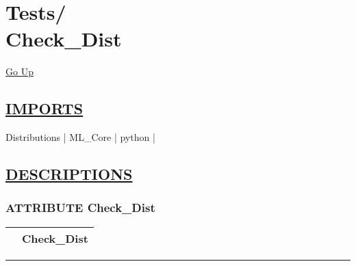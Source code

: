 \chapter*{\color{headfile}
{\large Tests\slash\hspace{0pt}}
 \\
Check_Dist
}
\hypertarget{ecldoc:toc:Tests.Check_Dist}{}
\hyperlink{ecldoc:toc:root/Tests}{Go Up}

\section*{\underline{\textsf{IMPORTS}}}
\begin{doublespace}
{\large
Distributions |
ML\_Core |
python |
}
\end{doublespace}

\section*{\underline{\textsf{DESCRIPTIONS}}}
\subsection*{\textsf{\colorbox{headtoc}{\color{white} ATTRIBUTE}
Check\_Dist}}

\hypertarget{ecldoc:tests.check_dist}{}

{\renewcommand{\arraystretch}{1.5}
\begin{tabularx}{\textwidth}{|>{\raggedright\arraybackslash}l|X|}
\hline
\hspace{0pt}\mytexttt{\color{red} } & \textbf{Check\_Dist} \\
\hline
\end{tabularx}
}

\par


\rule{\linewidth}{0.5pt}
